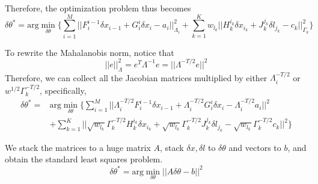 Therefore, the optimization problem thus becomes
\begin{equation}
\delta \theta^* = \text{arg}\min\limits_{\delta \theta}\{\sum\limits_{i=1}^M||F_i^{i-1}\delta x_{i-1} + G_i^i\delta x_i - a_i||_{\Lambda_i}^2 + \sum_{k=1}^Kw_{l_k}||H_k^{i_k}\delta x_{i_k} + J_k^{j_k}\delta l_{j_k} - c_k||_{\Gamma_k}^2\}
\end{equation}

To rewrite the Mahalanobis norm, notice that
\begin{equation}
||e||_{\Lambda}^2 = e^T\Lambda^{-1}e = ||\Lambda^{-T/2}e||^2
\end{equation}
Therefore, we can collect all the Jacobian matrices multiplied by either $\Lambda_i^{-T/2}$ or $w^{1/2}\Gamma_k^{-T/2}$, specifically,
\begin{equation}
\begin{aligned}
\delta \theta^* =& \text{arg}\min\limits_{\delta \theta}\{\sum\limits_{i=1}^M||\Lambda_i^{-T/2}F_i^{i-1}\delta x_{i-1} + \Lambda_i^{-T/2} G_i^i\delta x_i - \Lambda_i^{-T/2}a_i||^2  \\
&+\sum_{k=1}^K||\sqrt{w_{l_k}}\Gamma_k^{-T/2} H_k^{i_k}\delta x_{i_k} + \sqrt{w_{l_k}}\Gamma_k^{-T/2}J_k^{j_k}\delta l_{j_k} - \sqrt{w_{l_k}}\Gamma_k^{-T/2}c_k||^2\}
\end{aligned}
\end{equation}


We stack the matrices to a huge matrix $A$, stack $\delta x, \delta l$ to $\delta \theta$ and vectors to $b$, and obtain the standard least squares problem.
\begin{equation}
\delta \theta^* = \text{arg}\min\limits_{\delta \theta}||A\delta \theta - b||^2
\end{equation}









